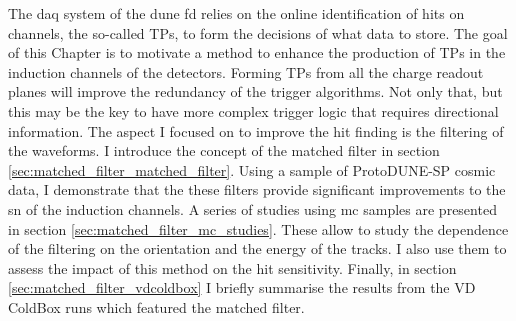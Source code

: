 The \gls{daq} system of the \gls{dune} \gls{fd} relies on the online identification of hits on channels, the so-called TPs, to form the decisions of what data to store. The goal of this Chapter is to motivate a method to enhance the production of TPs in the induction channels of the detectors. Forming TPs from all the charge readout planes will improve the redundancy of the trigger algorithms. Not only that, but this may be the key to have more complex trigger logic that requires directional information. The aspect I focused on to improve the hit finding is the filtering of the waveforms. I introduce the concept of the matched filter in section \ref{sec:matched_filter_matched_filter}. Using a sample of ProtoDUNE-SP cosmic data, I demonstrate that the these filters provide significant improvements to the \gls{sn} of the induction channels. A series of studies using \gls{mc} samples are presented in section \ref{sec:matched_filter_mc_studies}. These allow to study the dependence of the filtering on the orientation and the energy of the tracks. I also use them to assess the impact of this method on the hit sensitivity. Finally, in section \ref{sec:matched_filter_vdcoldbox} I briefly summarise the results from the VD ColdBox runs which featured the matched filter.
